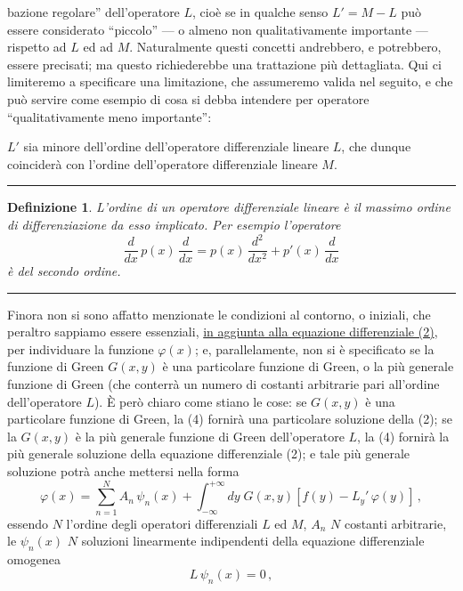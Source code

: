 \documentclass[11pt, a4paper]{book}
\numberwithin{equation}{section}
\newtheorem{definizione}{Definizione}[section]
\begin{document}

bazione regolare'' dell'operatore $L$, cioè se in qualche senso $L' = M - L$ può essere considerato ``piccolo'' --- o almeno non qualitativamente importante --- rispetto ad $L$ ed ad $M$. Naturalmente questi concetti andrebbero, e potrebbero, essere precisati; ma questo richiederebbe una trattazione più dettagliata. Qui ci limiteremo a specificare una limitazione, che assumeremo valida nel seguito, e che può servire come esempio di cosa si debba intendere per operatore ``qualitativamente meno importante'':

$L'$ sia minore dell'ordine dell'operatore differenziale lineare $L$, che dunque coinciderà con l'ordine dell'operatore differenziale lineare $M$.

\noindent\rule{\linewidth}{0.4pt}

\begin{definizione}
L'ordine di un operatore differenziale lineare è il massimo ordine di differenziazione da esso implicato. Per esempio l'operatore
\[
\frac{d}{dx}\,p(x)\,\frac{d}{dx} = p(x)\,\frac{d^2}{dx^2} + p'(x)\,\frac{d}{dx}
\]
è del secondo ordine.
\end{definizione}

\noindent\rule{\linewidth}{0.4pt}

Finora non si sono affatto menzionate le condizioni al contorno, o iniziali, che peraltro sappiamo essere essenziali, \uline{in aggiunta alla equazione differenziale (2)}, per individuare la funzione $\varphi(x)$; e, parallelamente, non si è specificato se la funzione di Green $G(x,y)$ è una particolare funzione di Green, o la più generale funzione di Green (che conterrà un numero di costanti arbitrarie pari all'ordine dell'operatore $L$). È però chiaro come stiano le cose: se $G(x,y)$ è una particolare funzione di Green, la (4) fornirà una particolare soluzione della (2); se la $G(x,y)$ è la più generale funzione di Green dell'operatore $L$, la (4) fornirà la più generale soluzione della equazione differenziale (2); e tale più generale soluzione potrà anche mettersi nella forma
\begin{equation}
\tag{5} \varphi(x) = \sum_{n=1}^{N} A_n\,\psi_n(x) + \int_{-\infty}^{+\infty} dy\; G(x,y)\left[f(y) - L_y'\,\varphi(y)\right]\,,
\end{equation}
essendo $N$ l'ordine degli operatori differenziali $L$ ed $M$, $A_n$ $N$ costanti arbitrarie, le $\psi_n(x)$ $N$ soluzioni linearmente indipendenti della equazione differenziale omogenea
\begin{equation}
\tag{6} L\,\psi_n(x) = 0\,,
\end{equation}
\end{document}
